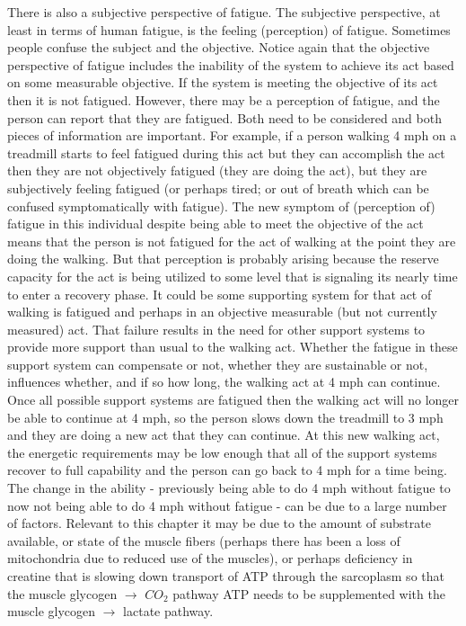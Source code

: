 There is also a subjective perspective of fatigue. The subjective perspective, at least in terms of human fatigue, is the feeling (perception) of fatigue. Sometimes people confuse the subject and the objective. Notice again that the objective perspective of fatigue includes the inability of the system to achieve its act based on some measurable objective. If the system is meeting the objective of its act then it is not fatigued. However, there may be a perception of fatigue, and the person can report that they are fatigued. Both need to be considered and both pieces of information are important. For example, if a person walking 4 mph on a treadmill starts to feel fatigued during this act but they can accomplish the act then they are not objectively fatigued (they are doing the act), but they are subjectively feeling fatigued (or perhaps tired; or out of breath which can be confused symptomatically with fatigue). The new symptom of (perception of) fatigue in this individual despite being able to meet the objective of the act means that the person is not fatigued for the act of walking at the point they are doing the walking. But that perception is probably arising because the reserve capacity for the act is being utilized to some level that is signaling its nearly time to enter a recovery phase. It could be some supporting system for that act of walking is fatigued and perhaps in an objective measurable (but not currently measured) act. That failure results in the need for other support systems to provide more support than usual to the walking act. Whether the fatigue in these support system can compensate or not, whether they are sustainable or not, influences whether, and if so how long, the walking act at 4 mph can continue. Once all possible support systems are fatigued then the walking act will no longer be able to continue at 4 mph, so the person slows down the treadmill to 3 mph and they are doing a new act that they can continue. At this new walking act, the energetic requirements may be low enough that all of the support systems recover to full capability and the person can go back to 4 mph for a time being. The change in the ability - previously being able to do 4 mph without fatigue to now not being able to do 4 mph without fatigue - can be due to a large number of factors. Relevant to this chapter it may be due to the amount of substrate available, or state of the muscle fibers (perhaps there has been a loss of mitochondria due to reduced use of the muscles), or perhaps deficiency in creatine that is slowing down transport of ATP through the sarcoplasm so that the muscle glycogen $\rightarrow$ $CO_2$ pathway ATP needs to be supplemented with the muscle glycogen $\rightarrow$ lactate pathway.

